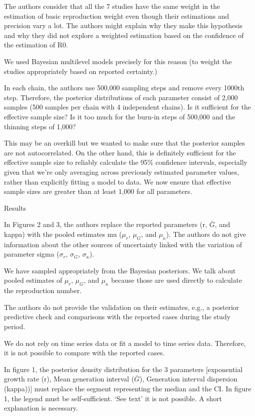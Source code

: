 \documentclass[12pt]{article}
\newcommand{\revtext}{\textsf}
\begin{document}
\revtext{The authors consider that all the 7 studies have the same weight in the estimation of basic
reproduction weight even though their estimations and precision vary a lot. The authors might
explain why they make this hypothesis and why they did not explore a weighted estimation
based on the confidence of the estimation of R0.}

We used Bayesian multilevel models precisely for this reason (to weight the studies appropriately based on reported certainty.)

\revtext{In each chain, the authors use 500,000 sampling steps and remove every 1000th step.
Therefore, the posterior distributions of each parameter consist of 2,000 samples (500 samples
per chain with 4 independent chains). Is it sufficient for the effective sample size? Is it too much
for the burn-in steps of 500,000 and the thinning steps of 1,000?}

This may be an overkill but we wanted to make sure that the posterior samples are not autocorrelated.
On the other hand, this is definitely sufficient for the effective sample size to reliably calculate the 95\% confidence intervals, especially given that we're only averaging across previously estimated parameter values, rather than explicitly fitting a model to data. We now ensure that effective sample sizes are greater than at least 1,000 for all parameters.

\revtext{Results}

\revtext{In Figures 2 and 3, the authors replace the reported parameters (r, $\bar G$, and kappa) with the
pooled estimates mu ($\mu_r$, $\mu_G$, and $\mu_\kappa$). The authors do not give information about
the other sources of uncertainty linked with the variation of parameter sigma ($\sigma_r$, $\sigma_G$,
$\sigma_\kappa$).}

We have sampled appropriately from the Bayesian posteriors. We talk about pooled estimates of $\mu_r$, $\mu_G$, and $\mu_\kappa$ because those are used directly to calculate the reproduction number.

\revtext{The authors do not provide the validation on their estimates, e.g., a posterior predictive check
and comparisons with the reported cases during the study period.}

We do not rely on time series data or fit a model to time series data. Therefore, it is not possible to compare with the reported cases.

\revtext{In figure 1, the posterior density distribution for the 3 parameters [exponential growth rate (r),
Mean generation interval ($\bar G$), Generation interval dispersion (kappa))] must replace the
segment representing the median and the CI. In figure 1, the legend must be self-sufficient. ‘See
text’ it is not possible. A short explanation is necessary.}
\end{document}

